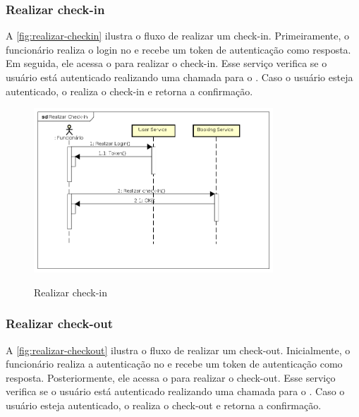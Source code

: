 \subsubsection{Realizar check-in}
A \autoref{fig:realizar-checkin} ilustra o fluxo de realizar um check-in. Primeiramente, o funcionário realiza o login no  e recebe um token de autenticação como resposta. Em seguida, ele acessa o  para realizar o check-in. Esse serviço verifica se o usuário está autenticado realizando uma chamada para o . Caso o usuário esteja autenticado, o  realiza o check-in e retorna a confirmação.

\begin{figure}[H]
    \centering
    \caption{Realizar check-in}
    \includegraphics[width=0.8\textwidth]{media/realizar-checkin.png}
    \label{fig:realizar-checkin}
\end{figure}

\subsubsection{Realizar check-out}
A \autoref{fig:realizar-checkout} ilustra o fluxo de realizar um check-out. Inicialmente, o funcionário realiza a autenticação no  e recebe um token de autenticação como resposta. Posteriormente, ele acessa o  para realizar o check-out. Esse serviço verifica se o usuário está autenticado realizando uma chamada para o . Caso o usuário esteja autenticado, o  realiza o check-out e retorna a confirmação.


